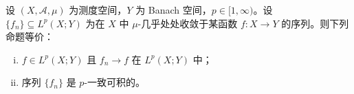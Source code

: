 \documentclass[../../main.tex]{subfiles}%
\begin{document}
\begin{theorem}[Vitali]\label{theorem:ch04-Vitali}
设 $(X,\mathcal{A},\mu)$ 为测度空间，$Y$ 为 Banach 空间，$p\in[1,\infty)$。设 $\{f_n\}\subseteq L^p(X;Y)$ 为在 $X$ 中 $\mu$-几乎处处收敛于某函数 $f:X\to Y$ 的序列。则下列命题等价：
\begin{enumerate}[(i)]
\item\label{item:ch04-Vitali-i} $f\in L^p(X;Y)$ 且 $f_n\to f$ 在 $L^p(X;Y)$ 中；
\item\label{item:ch04-Vitali-ii} 序列 $\{f_n\}$ 是 $p$-一致可积的。
\end{enumerate}
\end{theorem}

\end{document}
